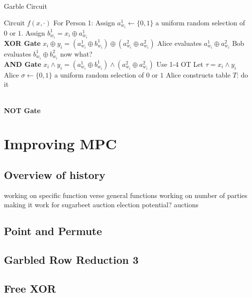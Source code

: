 \documentclass[12pt,twoside]{reedthesis}
\begin{document}
\begin{algorithm}
\caption{Garble Circuit}
\label{alg:gmw}
\begin{algorithmic}
    \Require Circuit $f(x,\cdot)$ 
    \State For Person 1:
        \State Assign $a^1_{w_i} \leftarrow \{0,1\}$
        \Comment a uniform random selection of $0$ or $1$.
        \State Assign $b^1_{w_i} = x_i \oplus a_{w_i}^1$
    \EndFor \\
    
    \State \textbf{XOR Gate}
    \Comment $x_i \oplus y_i = (a_{w_i}^1 \oplus b_{w_i}^1) \oplus (a_{w_i}^2 \oplus a_{w_i}^2)$
    \State Alice evaluates $a_{w_i}^1 \oplus a_{w_i}^2$
    \State Bob evaluates $b_{w_i}^1 \oplus b_{w_i}^2$
    \State now what?
    \\
    
    \State \textbf{AND Gate}
    \Comment $x_i \wedge y_i = (a_{w_i}^1 \oplus b_{w_i}^1) \wedge (a_{w_i}^2 \oplus a_{w_i}^2)$
    \State Use 1-4 OT
    \State Let $\tau = x_i \wedge y_i$
    \State Alice $\sigma \leftarrow \{0,1\}$
    \Comment a uniform random selection of $0$ or $1$
    \State Alice constructs table $T$:
     	\State do it
     \EndFor

    
    \\
    \State \textbf{NOT Gate}

\end{algorithmic}
\end{algorithm}


\section{Improving MPC}
\subsection{Overview of history}
working on specific function verse general functions
working on number of parties
making it work for sugarbeet auction
election potential?
auctions


\subsection{Point and Permute}
\subsection{Garbled Row Reduction 3}
\subsection{Free XOR}
\end{document}
